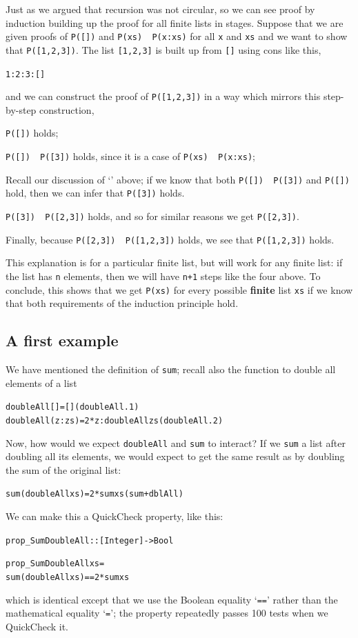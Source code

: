 Just as we argued that recursion was not circular, so we can see proof
by induction building up the proof for all finite lists in stages. Suppose that we
are given proofs of
\texttt{P([])} and \texttt{P(xs) \imp\ P(x:xs)} for all \texttt{x} and \texttt{xs}
and we want to show that
\texttt{P([1,2,3])}. The list \texttt{[1,2,3]} is built up from
\texttt{[]} using cons like this,
\begin{alltt}
1:2:3:[]
\end{alltt}
and we can construct the proof of \texttt{P([1,2,3])} in a way which
mirrors this
step-by-step construction,
\begin{titemize}
\item \texttt{P([])} holds;
\item \texttt{P([]) \imp\ P([3])} holds, since it is a case of
\texttt{P(xs) \imp\ P(x:xs)};
\item Recall our
discussion of `\imp' above; if we know that both \texttt{P([]) \imp\ P([3])} and 
\texttt{P([])} hold, then 
we can infer that \texttt{P([3])} holds.
\item \texttt{P([3]) \imp\ P([2,3])} holds, and so for similar reasons
we get \texttt{P([2,3])}.
\item Finally, because \texttt{P([2,3]) \imp\ P([1,2,3])} holds,
we see that \texttt{P([1,2,3])} holds.
\end{titemize}
This explanation is for a particular finite list, but will work for any finite list: if
the list has \texttt{n} elements, then we will have \texttt{n+1} steps like the four above.
To conclude, this shows that we get \texttt{P(xs)} for every possible \textbf{finite} list 
\texttt{xs} if we know that both requirements of the induction principle hold.

\subsection*{A first example}

We have mentioned the definition of \texttt{sum}; recall also the
function to double all elements of a list
\begin{alltt}
doubleAll []     = []\hfill(doubleAll.1)
doubleAll (z:zs) = 2*z : doubleAll zs\hfill(doubleAll.2)
\end{alltt}
Now, how would we expect \texttt{doubleAll} and \texttt{sum} to
interact? If we \texttt{sum} a list after doubling all its elements, we
would expect to get the same result as by doubling the sum of the original
list:
\begin{alltt}
sum (doubleAll xs) = 2 * sum xs\hfill(sum+dblAll)
\end{alltt}
We can make this a QuickCheck property, like this:
\begin{alltt}
prop_SumDoubleAll :: [Integer] -> Bool

prop_SumDoubleAll xs =
    sum (doubleAll xs) == 2 * sum xs
\end{alltt}
which is identical except that we use the Boolean equality `\texttt{==}' rather than the mathematical equality `\texttt{=}'; the property repeatedly passes 100 tests when we QuickCheck it.


